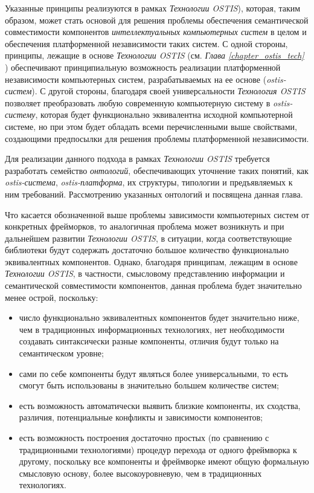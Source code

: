 Указанные принципы реализуются в рамках \textit{Технологии OSTIS}), которая, таким образом, может стать основой для решения проблемы обеспечения семантической совместимости компонентов \textit{интеллектуальных компьютерных систем} в целом и обеспечения платформенной независимости таких систем.
С одной стороны, принципы, лежащие в основе \textit{Технологии OSTIS} (см. \textit{Глава \ref{chapter_ostis_tech} }) обеспечивают принципиальную возможность реализации платформенной независимости компьютерных систем, разрабатываемых на ее основе (\textit{ostis-систем}). С другой стороны, благодаря своей универсальности \textit{Технология OSTIS} позволяет преобразовать любую современную компьютерную систему в \textit{ostis-систему}, которая будет функционально эквивалентна исходной компьютерной системе, но при этом будет обладать всеми перечисленными выше свойствами, создающими предпосылки для решения проблемы платформенной независимости.

Для реализации данного подхода в рамках \textit{Технологии OSTIS} требуется разработать семейство \textit{онтологий}, обеспечивающих уточнение таких понятий, как \textit{ostis-система}, \textit{ostis-платформа}, их структуры, типологии и предъявляемых к ним требований. Рассмотрению указанных онтологий и посвящена данная глава.

Что касается обозначенной выше проблемы зависимости компьютерных систем от конкретных фрейморков, то аналогичная проблема может возникнуть и при дальнейшем развитии \textit{Технологии OSTIS}, в ситуации, когда соответствующие библиотеки будут содержать достаточно большое количество функционально эквивалентных компонентов. Однако, благодаря принципам, лежащим в основе \textit{Технологии OSTIS}, в частности, смысловому представлению информации и семантической совместимости компонентов, данная проблема будет значительно менее острой, поскольку:
\begin{itemize}
	\item число функционально эквивалентных компонентов будет значительно ниже, чем в традиционных информационных технологиях, нет необходимости создавать синтаксически разные компоненты, отличия будут только на семантическом уровне;
	\item сами по себе компоненты будут являться более универсальными, то есть смогут быть использованы в значительно большем количестве систем;
	\item есть возможность автоматически выявить близкие компоненты, их сходства, различия, потенциальные конфликты и зависимости компонентов;
	\item есть возможность построения достаточно простых (по сравнению с традиционными технологиями) процедур перехода от одного фреймворка к другому, поскольку все компоненты и фреймворке имеют общую формальную смысловую основу, более высокоуровневую, чем в традиционных технологиях.
\end{itemize}

